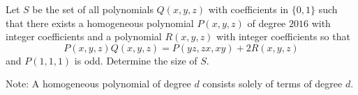 Let $S$ be the set of all polynomials $Q(x,y,z)$ with coefficients in $\{0,1\}$ such that there exists a homogeneous polynomial $P(x,y,z)$ of degree $2016$ with integer coefficients and a polynomial $R(x,y,z)$ with integer coefficients so that \[P(x,y,z) Q(x,y,z) = P(yz,zx,xy)+2R(x,y,z)\] and $P(1,1,1)$ is odd. Determine the size of $S$.

Note: A homogeneous polynomial of degree $d$ consists solely of terms of degree $d$.
